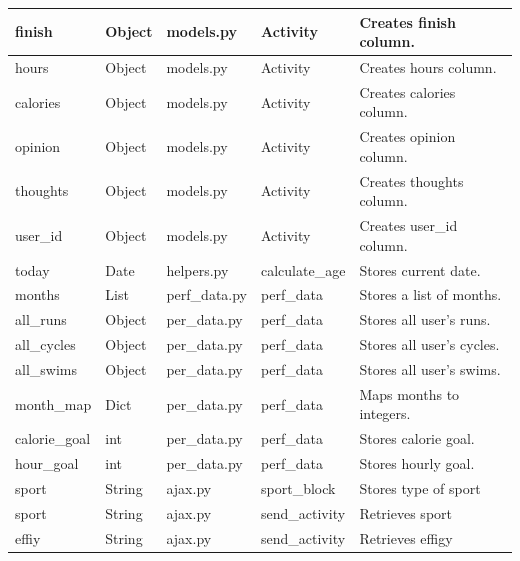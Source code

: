 \documentclass{article}[12pt,a4paper]
\begin{document}
\begin{longtable}{|l|l|l|l|l|}
finish          & Object        & models.py           & Activity                & Creates finish column.      \\ \hline
hours           & Object        & models.py           & Activity                & Creates hours column.       \\ \hline
calories        & Object        & models.py           & Activity                & Creates calories column.    \\ \hline
opinion         & Object        & models.py           & Activity                & Creates opinion column.     \\ \hline
thoughts        & Object        & models.py           & Activity                & Creates thoughts column.    \\ \hline
user\_id        & Object        & models.py           & Activity                & Creates user\_id column.    \\ \hline
today           & Date          & helpers.py          & calculate\_age          & Stores current date.        \\ \hline
months          & List          & perf\_data.py       & perf\_data              & Stores a list of months.        \\ \hline
all\_runs       & Object        & per\_data.py        & perf\_data              & Stores all user's runs.     \\ \hline
all\_cycles     & Object        & per\_data.py        & perf\_data              & Stores all user's cycles.   \\ \hline
all\_swims      & Object        & per\_data.py        & perf\_data              & Stores all user's swims.    \\ \hline
month\_map      & Dict          & per\_data.py        & perf\_data              & Maps months to integers.        \\ \hline
calorie\_goal   & int           & per\_data.py        & perf\_data              & Stores calorie goal.        \\ \hline
hour\_goal      & int           & per\_data.py        & perf\_data              & Stores hourly goal.         \\ \hline
sport             & String      & ajax.py        & sport\_block        & Stores type of sport                \\ \hline
sport             & String      & ajax.py        & send\_activity      & Retrieves sport                     \\ \hline
effiy             & String      & ajax.py        & send\_activity      & Retrieves effigy                    \\ \hline

\end{longtable}
\end{document}
